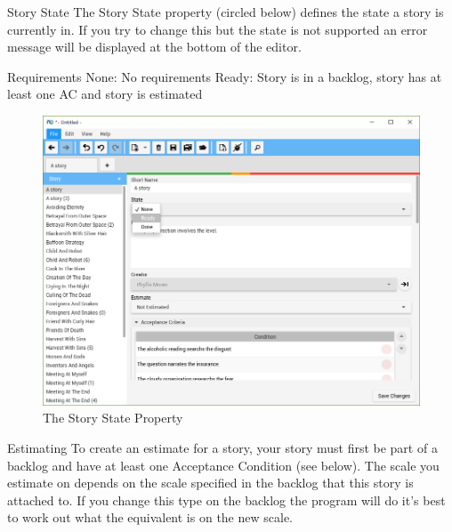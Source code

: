 Story State\newline
The Story State property (circled below) defines the state a story is currently in. If you try to change this but the state is not supported an error message will be displayed at the bottom of the editor. \newline

Requirements\newline
None: No requirements\newline
Ready: Story is in a backlog, story has at least one AC and story is estimated

\begin{figure}[H]
\centering
\includegraphics[width=\textwidth]{images/screenshots/Readiness1.PNG}
\caption{The Story State Property}
\label{fig:new_project}
\end{figure}

Estimating\newline
To create an estimate for a story, your story must first be part of a backlog and have at least one Acceptance Condition (see below). The scale you estimate on depends on the scale specified in the backlog that this story is attached to. If you change this type on the backlog the program will do it's best to work out what the equivalent is on the new scale.

